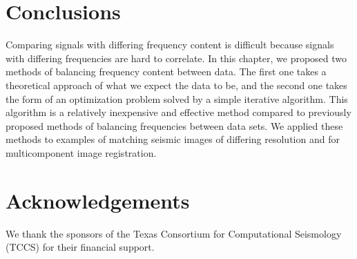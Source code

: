 
\section{Conclusions}
        Comparing signals with differing frequency content is difficult because signals with differing frequencies are hard to correlate. 
        In this chapter, we proposed two methods of balancing frequency content between data. 
        The first one takes a theoretical approach of what we expect the data to be, and the second one takes the form of an optimization problem solved by a simple iterative algorithm. 
        This algorithm is a relatively inexpensive and effective method compared to previously proposed methods of balancing frequencies between data sets. 
        We applied these methods to examples of matching seismic images of differing resolution and for multicomponent image registration.


\section{Acknowledgements}
        We thank the sponsors of the Texas Consortium for Computational Seismology (TCCS) for their financial support.
